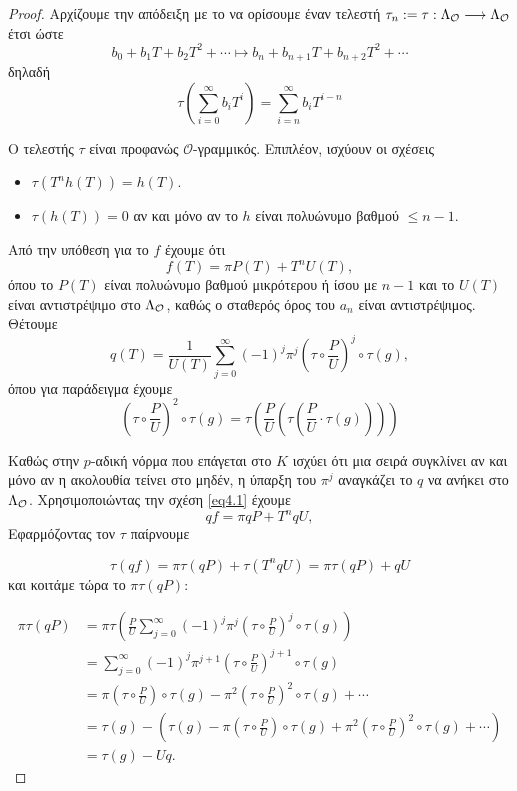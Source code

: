 \begin{proof}
	Αρχίζουμε την απόδειξη με το να ορίσουμε έναν  τελεστή $\tau_n:= \tau: \Lambda_\mathcal{O} \longrightarrow \Lambda_\mathcal{O}$ έτσι ώστε
	$$b_0 + b_1 T + b_2 T^2 + \cdots \longmapsto b_n + b_{n+1}T + b_{n+2}T^2 + \cdots$$
	δηλαδή 
	$$\tau\left(\sum\limits_{i=0}^\infty b_i T^i\right) = \sum\limits_{i=n}^\infty b_i T^{i-n}$$

	\noindent Ο τελεστής $\tau$ είναι προφανώς $\mathcal{O}$-γραμμικός. Επιπλέον, ισχύουν οι σχέσεις
	\begin{itemize}
		\item $\tau(T^n h(T)) = h(T)$.
		\item $\tau(h(T)) = 0$ αν και μόνο αν το $h$ είναι πολυώνυμο βαθμού $\leq n-1$.
	\end{itemize}

	\noindent Από την υπόθεση για το $f$ έχουμε ότι 
	\begin{equation}
		\label{eq4.1}
		f(T) = \pi P(T) + T^n U(T),
	\end{equation}
	όπου το $P(T)$ είναι πολυώνυμο βαθμού μικρότερου ή ίσου με $n-1$ και το $U(T)$ είναι αντιστρέψιμο στο $\Lambda_\mathcal{O}$, καθώς ο σταθερός όρος του $a_n$ είναι 
	αντιστρέψιμος. Θέτουμε
	$$q(T) = \frac{1}{U(T)} \sum\limits_{j=0}^\infty (-1)^j \pi^j \left( \tau \circ \frac{P}{U}\right)^j \circ \tau(g),$$ όπου για παράδειγμα έχουμε
	$$\left( \tau \circ \frac{P}{U}\right)^2 \circ \tau(g) = \tau \left(\frac{P}{U}\left(\tau \left(\frac{P}{U}\cdot \tau(g)\right)\right)\right)$$

	\noindent Καθώς στην $p$-αδική νόρμα που επάγεται στο $K$ ισχύει ότι μια σειρά συγκλίνει αν και μόνο αν η ακολουθία τείνει στο μηδέν, η ύπαρξη του $\pi^j$ αναγκάζει το $q$ να ανήκει στο $\Lambda_\mathcal{O}$. Χρησιμοποιώντας την σχέση \ref{eq4.1} έχουμε
	$$qf = \pi q P + T^n q U,$$
	Εφαρμόζοντας τον $\tau$ παίρνουμε 

	\begin{equation}
		\label{eq4.2}
		\tau(qf) = \pi \tau(qP) + \tau(T^nqU) = \pi \tau(qP)+qU
	\end{equation}
	και κοιτάμε τώρα το $\pi \tau(qP)$:

	\begin{align*}
		\pi \tau(qP) &= \pi \tau \left( \frac{P}{U} \sum\limits_{j=0}^\infty (-1)^j \pi^j \left(\tau \circ \frac{P}{U}\right)^j \circ \tau(g)\right) \\
		&= \sum\limits_{j=0}^\infty (-1)^j \pi^{j+1}\left(\tau\circ \frac{P}{U}\right)^{j+1}\circ \tau(g) \\
		&= \pi \left(\tau \circ \frac{P}{U}\right)\circ \tau(g) - \pi^2\left(\tau \circ \frac{P}{U}\right)^2 \circ \tau(g) + \cdots \\
		&=\tau(g) - \left(\tau(g) - \pi \left(\tau \circ \frac{P}{U}\right)\circ \tau(g) + \pi^2 \left(\tau \circ \frac{P}{U}\right)^2 \circ \tau(g) + \cdots \right) \\
		&= \tau(g) - Uq.
	\end{align*}


\end{proof}

